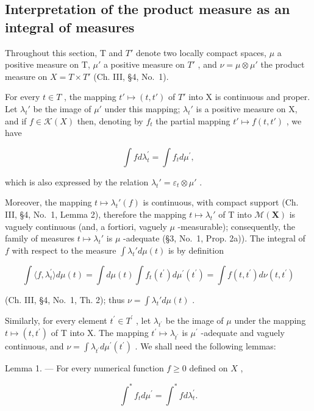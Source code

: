 \subsection{Interpretation of the product measure as an integral of measures}

Throughout this section, T and \(T'\) denote two locally compact spaces, \(\mu\) a positive measure on T, \(\mu'\) a positive measure on \(T'\) , and \(\nu = \mu \otimes \mu'\) the product measure on \(X = T \times T'\) (Ch. III, §4, No.~1).

For every \(t \in T\) , the mapping \(t' \mapsto (t, t')\) of \(T'\) into X is continuous and proper. Let \(\lambda_t'\) be the image of \(\mu'\) under this mapping; \(\lambda_t'\) is a positive measure on X, and if \(f \in \mathcal{K}(X)\) then, denoting by \(f_t\) the partial mapping \(t' \mapsto f(t, t')\) , we have

\[
\int f d \lambda_ {t} ^ {\prime} = \int f _ {t} d \mu^ {\prime},\tag{1}
\]

which is also expressed by the relation \(\lambda_t' = \varepsilon_t \otimes \mu'\) .

Moreover, the mapping \(t \mapsto \lambda_t'(f)\) is continuous, with compact support (Ch. III, §4, No.~1, Lemma 2), therefore the mapping \(t \mapsto \lambda_t'\) of T into \(\mathcal{M}(\mathbf{X})\) is vaguely continuous (and, a fortiori, vaguely \(\mu\) -measurable); consequently, the family of measures \(t \mapsto \lambda_t'\) is \(\mu\) -adequate (§3, No.~1, Prop. 2a)). The integral of \(f\) with respect to the measure \(\int \lambda_t' d\mu(t)\) is by definition

\[
\int \langle f, \lambda_ {t} ^ {\prime} \rangle d \mu (t) = \int d \mu (t) \int f _ {t} (t ^ {\prime}) d \mu^ {\prime} (t ^ {\prime}) = \int f (t, t ^ {\prime}) d \nu (t, t ^ {\prime})
\]

(Ch. III, §4, No.~1, Th. 2); thus \(\nu = \int \lambda_t' d\mu(t)\) .

Similarly, for every element \(t^{\prime} \in T^{\prime}\) , let \(\lambda_{t^{\prime}}\) be the image of \(\mu\) under the mapping \(t \mapsto (t, t^{\prime})\) of T into X. The mapping \(t^{\prime} \mapsto \lambda_{t^{\prime}}\) is \(\mu^{\prime}\) -adequate and vaguely continuous, and \(\nu = \int \lambda_{t^{\prime}} d\mu^{\prime}(t^{\prime})\) . We shall need the following lemmas:

Lemma 1. --- For every numerical function \(f \geqslant 0\) defined on \(X\) ,

\[
\int^ {*} f _ {t} d \mu^ {\prime} = \int^ {*} f d \lambda_ {t} ^ {\prime}.\tag{2}
\]

